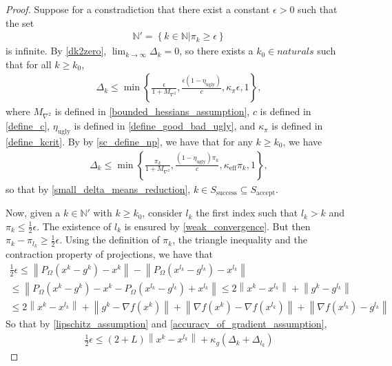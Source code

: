 \documentclass{article}
\theoremstyle{case}
\newcommand{\naturals}{{\mathbb N}}
\newcommand{\xk}{{x^k}}
\newcommand{\gk}{{g^k}}
\newcommand{\domain}{{\Omega}}
\newcommand{\dk}{{\Delta_k}}
\newcommand{\pik}{{\pi_k}}
\newcommand{\lip}{{L}}
\newcommand{\kappag}{{\kappa_{g}}}
\newcommand{\maxhes}{{M_{\nabla^2}}}
\newcommand{\kcrit}{{\kappa_{\pi}}}
\newcommand{\eugly}{{\eta_{\text{ugly}}}}
\newcommand{\accepting}{{S_{\text{accept}}}}
\newcommand{\success}{{S_{\text{success}}}}
\newcommand{\keff}{{\kappa_{\text{eff}}}}
\begin{document}
\begin{proof}
Suppose for a constradiction that there exist a constant $\epsilon > 0$ such that the set
\begin{align}
\naturals' = \left\{ k \in \naturals | \pik \ge \epsilon\right\} \label{sc_define_np}
\end{align}
is infinite.
By \cref{dk2zero}, $\lim_{k\to\infty} \dk = 0$, so there exists a $k_0 \in naturals$ such that for all $k \ge k_0$,
\begin{align*}
\dk \le \min\left\{\frac{\epsilon}{1 + \maxhes}, \frac{\epsilon\left(1 - \eugly\right)}{c}, \kcrit\epsilon, 1 \right\}, \label{sc_define_two}
\end{align*}
where
$\maxhes$ is defined in \cref{bounded_hessians_assumption},
$c$ is defined in \cref{define_c},
$\eugly$ is defined in \cref{define_good_bad_ugly},
and $\kcrit$ is defined in \cref{define_kcrit}.
By by \cref{sc_define_np}, we have that for any $k \ge k_0$, we have
\begin{align}
\dk \le \min\left\{\frac {\pik}{1 + \maxhes},\frac {(1 - \eugly)\pik}{c}, \keff\pik, 1 \right\},
\end{align}
so that by \cref{small_delta_means_reduction}, $k \in \success \subseteq  \accepting$.

Now, given a $k\in\naturals'$ with $k \ge k_0$, consider $l_k$ the first index such that $l_k > k$ and $\pik \le \frac 1 2 \epsilon$.
The existence of $l_k$ is ensured by \cref{weak_convergence}. But then $\pik - \pi_{l_k} \ge \frac 1 2 \epsilon$.
Using the definition of $\pik$, the triangle inequality and the contraction property of projections, we have that
\begin{align*}
\frac 1 2 \epsilon \le \left\| P_{\domain}\left(\xk - \gk\right) - \xk \right\| - \left\|P_{\domain}\left(x^{l_k} - g^{l_k}\right) - x^{l_k}\right\| \\
\le \left\|P_{\domain}\left(\xk - \gk\right) - \xk - P_{\domain}\left(x^{l_k} - g^{l_k}\right) + x^{l_k}\right\|
\le 2 \left\|\xk - x^{l_k}\right\| + \left\|\gk - g^{l_k}\right\| \\
\le 2 \left\|\xk - x^{l_k}\right\| + \left\|\gk - \nabla f(\xk) \right\| + \left\|\nabla f(\xk) - \nabla f(x^{l_k})\right\| + \left\|\nabla f(x^{l_k}) - g^{l_k}\right\|
\end{align*}
So that by \cref{lipschitz_assumption} and \cref{accuracy_of_gradient_assumption},
\begin{align}
\frac 1 2 \epsilon \le \left(2 + \lip\right) \left\|\xk - x^{l_k}\right\| + \kappag \left(\dk + \Delta_{l_k}\right) \label{sc_thats_not_right}
\end{align}


\end{proof}
\end{document}
